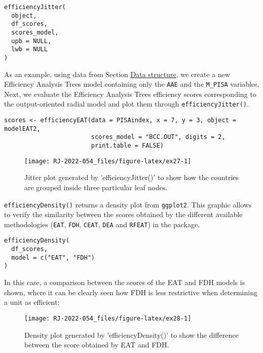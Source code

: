 \begin{verbatim}
efficiencyJitter(
  object,
  df_scores,
  scores_model,
  upb = NULL,
  lwb = NULL
)
\end{verbatim}

As an example, using data from Section \protect\hyperlink{section3}{Data structure}, we create a new Efficiency Analysis Trees model containing only the \texttt{AAE} and the \texttt{M\_PISA} variables. Next, we evaluate the Efficiency Analysis Trees efficiency scores corresponding to the output-oriented radial model and plot them through \texttt{efficiencyJitter()}.

\begin{verbatim}
scores <- efficiencyEAT(data = PISAindex, x = 7, y = 3, object = modelEAT2, 
                        scores_model = "BCC.OUT", digits = 2, 
                        print.table = FALSE)
\end{verbatim}

\begin{figure}

{\centering \texttt{[image: RJ-2022-054\_files/figure-latex/ex27-1]} 

}

\caption{Jitter plot generated by 'efficiencyJitter()' to show how the countries are grouped inside three particular leaf nodes.}\label{fig:ex27}
\end{figure}

\texttt{efficiencyDensity()} returns a density plot from \texttt{ggplot2}. This graphic allows to verify the similarity between the scores obtained by the different available methodologies (\texttt{EAT}, \texttt{FDH}, \texttt{CEAT}, \texttt{DEA} and \texttt{RFEAT}) in the  package.

\begin{verbatim}
efficiencyDensity(
  df_scores,
  model = c("EAT", "FDH")
)
\end{verbatim}

In this case, a comparison between the scores of the EAT and FDH models is shown, where it can be clearly seen how FDH is less restrictive when determining a unit as efficient:

\begin{figure}

{\centering \texttt{[image: RJ-2022-054\_files/figure-latex/ex28-1]} 

}

\caption{Density plot generated by 'efficiencyDensity()' to show the difference between the score obtained by EAT and FDH.}\label{fig:ex28}
\end{figure}

